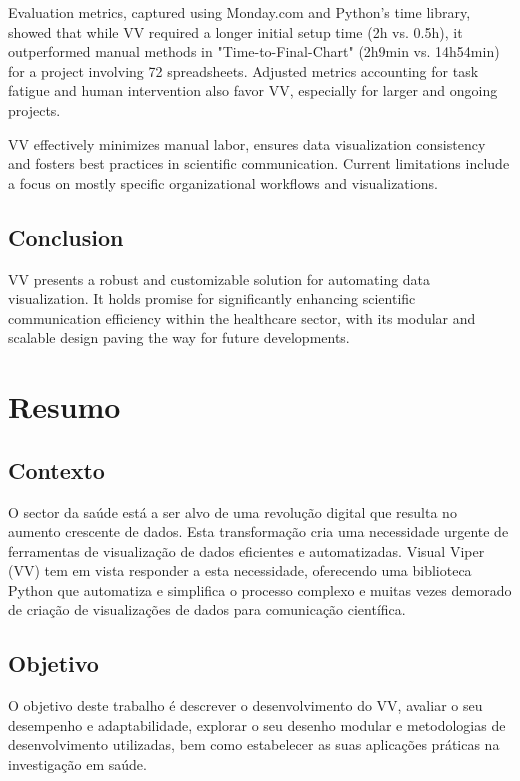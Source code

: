 Evaluation metrics, captured using Monday.com and Python's time library,
showed that while VV required a longer initial setup time (2h vs. 0.5h),
it outperformed manual methods in "Time-to-Final-Chart" (2h9min vs.
14h54min) for a project involving 72 spreadsheets. Adjusted metrics
accounting for task fatigue and human intervention also favor VV,
especially for larger and ongoing projects.

VV effectively minimizes manual labor, ensures data visualization
consistency and fosters best practices in scientific communication.
Current limitations include a focus on mostly specific organizational
workflows and visualizations.

\subsection*{Conclusion}\label{conclusion}

VV presents a robust and customizable solution for automating data
visualization. It holds promise for significantly enhancing scientific
communication efficiency within the healthcare sector, with its modular
and scalable design paving the way for future developments.

\newpage

\section{Resumo}\label{resumo}

\subsection*{Contexto}\label{contexto}

O sector da saúde está a ser alvo de uma revolução digital que resulta
no aumento crescente de dados. Esta transformação cria uma necessidade
urgente de ferramentas de visualização de dados eficientes e
automatizadas. Visual Viper (VV) tem em vista responder a esta
necessidade, oferecendo uma biblioteca Python que automatiza e
simplifica o processo complexo e muitas vezes demorado de criação de
visualizações de dados para comunicação científica.

\subsection*{Objetivo}\label{objetivo}

O objetivo deste trabalho é descrever o desenvolvimento do VV, avaliar o
seu desempenho e adaptabilidade, explorar o seu desenho modular e
metodologias de desenvolvimento utilizadas, bem como estabelecer as suas
aplicações práticas na investigação em saúde.

